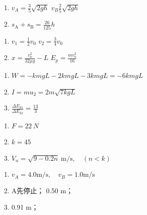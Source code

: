 \item \begin {enumerate} \renewcommand {\labelenumi }{\arabic {enumi}.} \item $v_{A}=\frac { 3 } { 5 } \sqrt { 2 g h }$ \qquad $v_{B}\frac { 2 } { 5 } \sqrt { 2 g h }$ \item $s _ { \mathrm { A } } + s _ { \mathrm { B } } = \frac { 26 } { 125 } h$ \par \end {enumerate} \par \par 
\item \begin {enumerate} \renewcommand {\labelenumi }{\arabic {enumi}.} \item $v _ { 1 } = \frac { 1 } { 2 } v _ { 0 }$ \qquad $v _ { 2 } = \frac { 3 } { 4 } v _ { 0 }$ \item $x = \frac { v _ { 0 } ^ { 2 } } { 32 \mu g } - L$ \qquad $E _ { p } = \frac { m v _ { 0 } ^ { 2 } } { 16 }$ \par \end {enumerate} \par \par 
\item \begin {enumerate} \renewcommand {\labelenumi }{\arabic {enumi}.} \item $W = - k m g L - 2 k m g L - 3 k m g L = - 6 k m g L$ \item $I = m u _ { 2 } = 2 m \sqrt { 7 k g L }$ \item $\frac { \Delta E _ { k 1 } } { \Delta E _ { k 2 } } = \frac { 13 } { 3 }$ \par \end {enumerate} \par \par 
\item \begin {enumerate} \renewcommand {\labelenumi }{\arabic {enumi}.} \item $ F=22\ N $ \item $ k=45 $ \item $V _ { n } = \sqrt { 9 - 0.2 n }\ \mathrm { m } / \mathrm { s } , \quad ( n < k )$ \end {enumerate} \par \par 
\item \begin {enumerate} \renewcommand {\labelenumi }{\arabic {enumi}.} \item $v _ { A } = 4.0 \mathrm { m } / \mathrm { s } , \quad v _ { B } = 1.0 \mathrm { m } / \mathrm { s }$ \item A先停止； 0.50 m； \item 0.91 m； \par \par \end {enumerate} \par \par 
